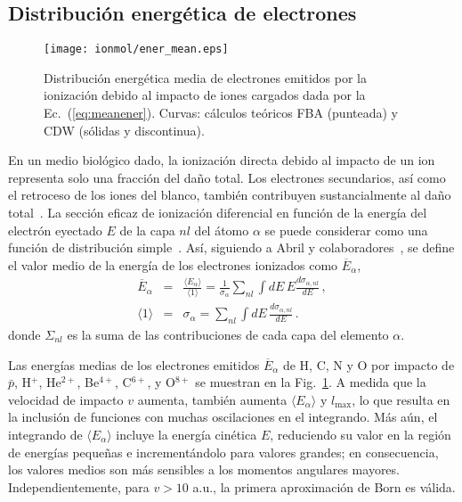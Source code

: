 \subsection{Distribución energética de electrones}
\label{subsec:meanener}

\begin{figure}
\centering
\texttt{[image: ionmol/ener\_mean.eps]}
\caption[Distribución energética media de electrones emitidos.]
{Distribución energética media de electrones emitidos por la ionización 
debido al impacto de iones cargados dada por la Ec.~(\ref{eq:meanener}). 
Curvas: cálculos teóricos FBA (punteada) y CDW (sólidas y 
discontinua).}
\label{fig:emittedener}
\end{figure} 

En un medio biológico dado, la ionización directa debido al impacto de 
un ion representa solo una fracción del daño total. Los electrones 
secundarios, así como el retroceso de los iones del blanco, también 
contribuyen sustancialmente al daño total~\cite{Denifl:11}. La sección 
eficaz de ionización diferencial en función de la energía del electrón 
eyectado $E$ de la capa $nl$ del átomo $\alpha$ se puede considerar como 
una función de distribución simple~\cite{Surdutovic:18}. Así, siguiendo 
a Abril y colaboradores~\cite{Abril:15}, se define el valor medio de la 
energía de los electrones ionizados como
$\overline{E}_{\alpha}$, 
\begin{eqnarray}
\overline{E}_{\alpha} &=&\frac{\langle E_{\alpha}\rangle}{\langle
1\rangle}=\frac{1}{\sigma_{\alpha}}\sum\limits_{nl}\int dE\,E
\frac{d\sigma_{\alpha,nl}}{dE}\,,  
\label{eq:meanener} \\
\langle 1\rangle &=&\sigma_{\alpha}=\sum\limits_{nl}\int dE\,
\frac{d\sigma_{\alpha,nl}}{dE}\,. 
\label{eq:normener}
\end{eqnarray}
donde $\Sigma_{nl}$ es la suma de las contribuciones de cada capa del 
elemento $\alpha$.

Las energías medias de los electrones emitidos $\overline{E}_{\alpha}$ 
de H, C, N y O por impacto de $\bar{p}$, H$^{+}$, He$^{2+}$, Be$^{4+}$, 
C$^{6+}$, y O$^{8+}$ se muestran en la Fig.~\ref{fig:emittedener}. 
A medida que la velocidad de impacto $v$ aumenta, también aumenta 
$\langle E_{\alpha}\rangle$ y $l_{\max}$, lo que resulta en la inclusión 
de funciones con muchas oscilaciones en el integrando. Más aún, el 
integrando de $\langle E_{\alpha}\rangle$ incluye la energía cinética 
$E$, reduciendo su valor en la región de energías pequeñas e 
incrementándolo para valores grandes; en consecuencia, los valores 
medios son más sensibles a los momentos angulares mayores. 
Independientemente, para $v>10$ a.u., la primera aproximación de Born 
es válida. 

